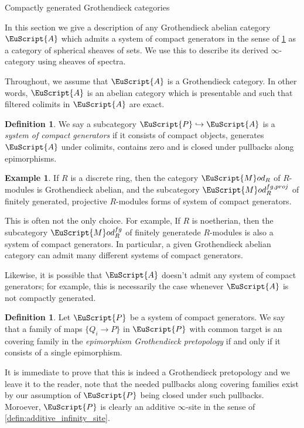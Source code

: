 \documentclass[oneside,a4paper]{amsart}
\makeatletter
\newcommand{\euscr}[1]{\EuScript{#1}} %
\newcommand{\acat}{\euscr{A}} %
\newcommand{\pcat}{\euscr{P}} %
\newcommand{\Mod}{\euscr{M}od} %
\theoremstyle{plain}
\theoremstyle{definition}
\newtheorem{example}[thm]{Example}
\newtheorem{defin}[thm]{Definition}
\theoremstyle{remark}
\def\subsection{\@startsection{subsection}{1}%
  \z@{.7\linespacing\@plus\linespacing}{.5\linespacing}%
  {\normalfont\bfseries\centering}}%
\makeatother
\begin{document}
\subsection{Compactly generated Grothendieck categories}

In this section we give a description of any Grothendieck abelian category $\acat$ which admits a system of compact generators in the sense of \cref{defin:choice_of_compact_generators} as a category of spherical sheaves of sets. We use this to describe its derived $\infty$-category using sheaves of spectra. 

Throughout, we assume that $\acat$ is a Grothendieck category. In other words, $\acat$ is an abelian category which is presentable and such that filtered colimits in $\acat$ are exact. 

\begin{defin}
\label{defin:choice_of_compact_generators}
We say a subcategory $\pcat \hookrightarrow \acat$ is a \emph{system of compact generators} if it consists of compact objects, generates $\acat$ under colimits, contains zero and is closed under pullbacks along epimorphisms. 
\end{defin}

\begin{example}
If $R$ is a discrete ring, then the category $\Mod_{R}$ of $R$-modules is Grothendieck abelian, and the subcategory $\Mod^{fg, proj}_{R}$ of finitely generated, projective $R$-modules forms of system of compact generators. 

This is often not the only choice. For example, If $R$ is noetherian, then the subcategory $\Mod^{fg}_{R}$ of finitely generatede $R$-modules is also a system of compact generators. In particular, a given Grothendieck abelian category can admit many different systems of compact generators. 

Likewise, it is possible that $\acat$ doesn't admit any system of compact generators; for example, this is necessarily the case whenever $\acat$ is not compactly generated. 
\end{example}

\begin{defin}
\label{defin:epimorphism_topology_on_a_choice_of_compact_generators}
Let $\pcat$ be a system of compact generators. We say that a family of maps $\{ Q_{i} \rightarrow P \}$ in $\pcat$ with common target is an covering family in the \emph{epimorphism Grothendieck pretopology} if and only if it consists of a single epimorphism. 
\end{defin}
It is immediate to prove that this is indeed a Grothendieck pretopology and we leave it to the reader, note that the needed pullbacks along covering families exist by our assumption of $\pcat$ being closed under such pullbacks. Moroever, $\pcat$ is clearly an additive $\infty$-site in the sense of \cref{defin:additive_infinity_site}. 
\end{document}
